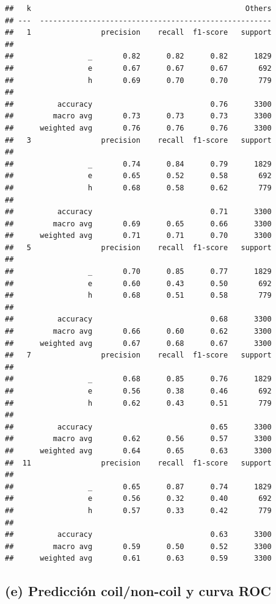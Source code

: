 \documentclass[
]{article}
\begin{document}
\begin{lstlisting}
##   k                                                 Others
## ---  -----------------------------------------------------
##   1                precision    recall  f1-score   support
## 
##                 _       0.82      0.82      0.82      1829
##                 e       0.67      0.67      0.67       692
##                 h       0.69      0.70      0.70       779
## 
##          accuracy                           0.76      3300
##         macro avg       0.73      0.73      0.73      3300
##      weighted avg       0.76      0.76      0.76      3300
##   3                precision    recall  f1-score   support
## 
##                 _       0.74      0.84      0.79      1829
##                 e       0.65      0.52      0.58       692
##                 h       0.68      0.58      0.62       779
## 
##          accuracy                           0.71      3300
##         macro avg       0.69      0.65      0.66      3300
##      weighted avg       0.71      0.71      0.70      3300
##   5                precision    recall  f1-score   support
## 
##                 _       0.70      0.85      0.77      1829
##                 e       0.60      0.43      0.50       692
##                 h       0.68      0.51      0.58       779
## 
##          accuracy                           0.68      3300
##         macro avg       0.66      0.60      0.62      3300
##      weighted avg       0.67      0.68      0.67      3300
##   7                precision    recall  f1-score   support
## 
##                 _       0.68      0.85      0.76      1829
##                 e       0.56      0.38      0.46       692
##                 h       0.62      0.43      0.51       779
## 
##          accuracy                           0.65      3300
##         macro avg       0.62      0.56      0.57      3300
##      weighted avg       0.64      0.65      0.63      3300
##  11                precision    recall  f1-score   support
## 
##                 _       0.65      0.87      0.74      1829
##                 e       0.56      0.32      0.40       692
##                 h       0.57      0.33      0.42       779
## 
##          accuracy                           0.63      3300
##         macro avg       0.59      0.50      0.52      3300
##      weighted avg       0.61      0.63      0.59      3300
\end{lstlisting}

\hypertarget{e-predicciuxf3n-coilnon-coil-y-curva-roc}{%
\subsection{(e) Predicción coil/non-coil y curva
ROC}\label{e-predicciuxf3n-coilnon-coil-y-curva-roc}}
\end{document}
